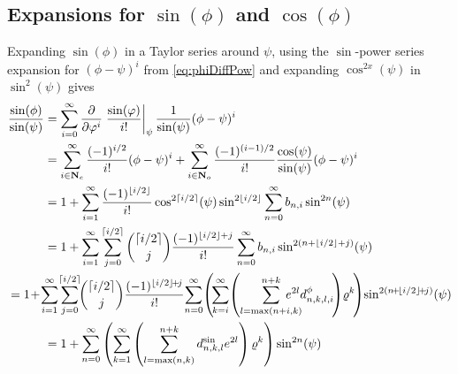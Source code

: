 \documentclass[a4paper]{amsart}
\begin{document}
\subsection{Expansions for $\sin(\phi)$ and $\cos(\phi)$}\label{app:sincos}
Expanding $\sin(\phi)$ in a Taylor series around $\psi$, using the $\sin$-power series expansion for $(\phi-\psi)^i$ from \eqref{eq:phiDiffPow} and expanding $\cos^{2x}(\psi)$ in $\sin^2(\psi)$ gives
\begin{align}
\nonumber\frac{\sin(\phi)}{\sin(\psi)}&=\sum_{i=0}^\infty\frac{\partial}{\partial\varphi^i}\left.\frac{\sin(\varphi)}{i!}\right|_{\psi}\frac{1}{\sin(\psi)}(\phi-\psi)^i\\
\label{eq:sin_split}\raisetag{-7.5mm}&=\sum_{i\in\mathbf{N}_e}^\infty\frac{(-1)^{i/2}}{i!}(\phi-\psi)^i+\sum_{i\in\mathbf{N}_o}^\infty\frac{(-1)^{(i-1)/2}}{i!}\frac{\cos(\psi)}{\sin(\psi)}(\phi-\psi)^i\\
\nonumber&=1+\sum_{i=1}^\infty\frac{(-1)^{\lfloor i/2\rfloor}}{i!}\cos^{2\lceil i/2\rceil}(\psi)\sin^{2\lfloor i/2\rfloor}\sum_{n=0}^\infty b_{n,i}\sin^{2n}(\psi)\\
\nonumber&=1+\sum_{i=1}^\infty\sum_{j=0}^{\lceil i/2\rceil}\binom{\lceil i/2\rceil}{j}\frac{(-1)^{\lfloor i/2\rfloor+j}}{i!}\sum_{n=0}^\infty b_{n,i}\sin^{2(n+\lfloor i/2\rfloor+j)}(\psi)\\
\nonumber&\!\!\!\!\!\!\!\!\!\!\!\!\!\!\!\!\!\!=1\!+\!\sum_{i=1}^\infty\!\sum_{j=0}^{\lceil i/2\rceil}\!\!\binom{\lceil i/2\rceil}{j}\frac{(-1)^{\lfloor i/2\rfloor\!+\!j}}{i!}\!\sum_{n=0}^\infty\! \left(\!\sum_{k=i}^\infty\!\left(\sum_{l=\max(n+i,k)}^{n+k}\!\!\!\!\!\!\!\!\! e^{2l}d^\phi_{n,k,l,i}\!\right)\!\varrho^k\!\right)\!\sin^{2(n\!+\!\lfloor i/2\rfloor\!+\!j)}(\psi)\\
\label{eq:sin}\raisetag{-9mm}&=1+\sum_{n=0}^\infty \left(\sum_{k=1}^\infty\left(\sum_{l=\max(n,k)}^{n+k} d^{\sin}_{n,k,l}e^{2l}\right)\varrho^k\right)\sin^{2n}(\psi)
\end{align}
\end{document}
